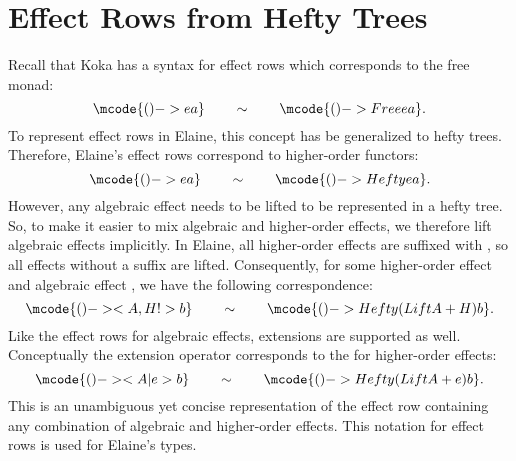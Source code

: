 \section{Effect Rows from Hefty Trees}

Recall that Koka has a syntax for effect rows which corresponds to the free monad:
\[\mcode{() -> e a}\qquad\sim\qquad\mcode{() -> Free e a}.\]
To represent effect rows in Elaine, this concept has be generalized to hefty trees. Therefore, Elaine's effect rows correspond to higher-order functors:
\[\mcode{() -> e a}\qquad\sim\qquad\mcode{() -> Hefty e a}.\]
However, any algebraic effect needs to be lifted to be represented in a hefty tree. So, to make it easier to mix algebraic and higher-order effects, we therefore lift algebraic effects implicitly. In Elaine, all higher-order effects are suffixed with \hs{!}, so all effects without a \el{!} suffix are lifted. Consequently, for some higher-order effect  and algebraic effect , we have the following correspondence:
\[\mcode{() -> <A,H!> b}\qquad\sim\qquad\mcode{() -> Hefty (Lift A + H) b}.\]
Like the effect rows for algebraic effects, extensions are supported as well. Conceptually the extension operator corresponds to the \hs{+} for higher-order effects:
\[\mcode{() -> <A|e> b}\qquad\sim\qquad\mcode{() -> Hefty (Lift A + e) b}.\]
This is an unambiguous yet concise representation of the effect row containing any combination of algebraic and higher-order effects. This notation for effect rows is used for Elaine's types. 

